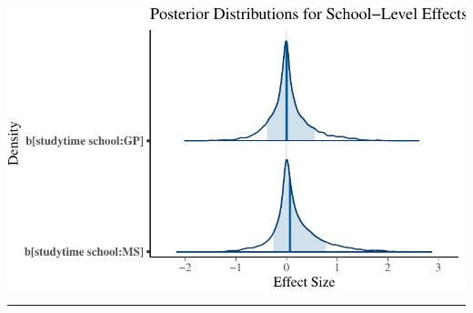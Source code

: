 \documentclass[
  10pt,
]{article}
\begin{document}
\includegraphics{551-HW-Q3_files/figure-pdf/unnamed-chunk-16-1.pdf}

\begin{center}\rule{0.5\linewidth}{0.5pt}\end{center}
\end{document}

